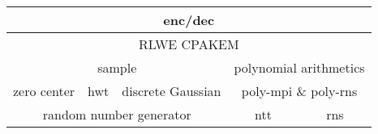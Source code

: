 \documentclass[preview]{standalone}
\begin{document}
\begin{tabular}{|c|c|c|c|c|c|}
\hline
\multicolumn{6}{|c|}{enc/dec}\\
\hline
\multicolumn{6}{|c|}{RLWE CPAKEM}\\
\hline
\multicolumn{3}{|c|}{sample}&\multicolumn{3}{|c|}{polynomial arithmetics}\\
\hline
zero center&hwt&discrete Gaussian&\multicolumn{3}{c|}{poly-mpi \& poly-rns}\\
\hline
\multicolumn{3}{|c|}{random number generator}&\multicolumn{2}{|c|}{ntt}&rns\\
\hline
\end{tabular}
\end{document}
